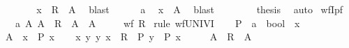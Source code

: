 \begin{isabellebody}
\ \ \ \ \isamarkupfalse%
\ \isamarkupfalse%
\ {\isachardoublequoteopen}x\ {\isasymnotin}\ R\ {\isacharbackquote}{\kern0pt}{\isacharbackquote}{\kern0pt}\ A{\isachardoublequoteclose}\ \isamarkupfalse%
\ blast\isanewline
\ \ \ \ \isamarkupfalse%
\ a\ \isamarkupfalse%
\ {\isachardoublequoteopen}x\ {\isasymnotin}\ A{\isachardoublequoteclose}\ \isamarkupfalse%
\ blast\isanewline
\ \ \isamarkupfalse%
\isanewline
\ \ \isamarkupfalse%
\ \isamarkupfalse%
\ {\isacharquery}{\kern0pt}thesis\ \isamarkupfalse%
\ auto\isanewline
{}\isamarkupfalse%
%
\endisatagproof
{\isafoldproof}%
%
\isadelimproof
\isanewline
%
\endisadelimproof
\isanewline
{}\isamarkupfalse%
\ wfI{\isacharunderscore}{\kern0pt}pf{\isacharcolon}{\kern0pt}\isanewline
\ \ \ a{\isacharcolon}{\kern0pt}\ {\isachardoublequoteopen}{\isasymAnd}A{\isachardot}{\kern0pt}\ A\ {\isasymsubseteq}\ R\ {\isacharbackquote}{\kern0pt}{\isacharbackquote}{\kern0pt}\ A\ {\isasymLongrightarrow}\ A\ {\isacharequal}{\kern0pt}\ {\isacharbraceleft}{\kern0pt}{\isacharbraceright}{\kern0pt}{\isachardoublequoteclose}\isanewline
\ \ \ {\isachardoublequoteopen}wf\ R{\isachardoublequoteclose}\isanewline
%
\isadelimproof
%
\endisadelimproof
%
\isatagproof
{}\isamarkupfalse%
\ {\isacharparenleft}{\kern0pt}rule\ wfUNIVI{\isacharparenright}{\kern0pt}\isanewline
\ \ \isamarkupfalse%
\ P\ {\isacharcolon}{\kern0pt}{\isacharcolon}{\kern0pt}\ {\isachardoublequoteopen}{\isacharprime}{\kern0pt}a\ {\isasymRightarrow}\ bool{\isachardoublequoteclose}\ \ x\isanewline
\ \ \isamarkupfalse%
\ {\isacharquery}{\kern0pt}A\ {\isacharequal}{\kern0pt}\ {\isachardoublequoteopen}{\isacharbraceleft}{\kern0pt}x{\isachardot}{\kern0pt}\ {\isasymnot}\ P\ x{\isacharbraceright}{\kern0pt}{\isachardoublequoteclose}\isanewline
\ \ \isamarkupfalse%
\ {\isachardoublequoteopen}{\isasymforall}x{\isachardot}{\kern0pt}\ {\isacharparenleft}{\kern0pt}{\isasymforall}y{\isachardot}{\kern0pt}\ {\isacharparenleft}{\kern0pt}y{\isacharcomma}{\kern0pt}\ x{\isacharparenright}{\kern0pt}\ {\isasymin}\ R\ {\isasymlongrightarrow}\ P\ y{\isacharparenright}{\kern0pt}\ {\isasymlongrightarrow}\ P\ x{\isachardoublequoteclose}\isanewline
\ \ \isamarkupfalse%
\ \isamarkupfalse%
\ {\isachardoublequoteopen}{\isacharquery}{\kern0pt}A\ {\isasymsubseteq}\ R\ {\isacharbackquote}{\kern0pt}{\isacharbackquote}{\kern0pt}\ {\isacharquery}{\kern0pt}A{\isachardoublequoteclose}\ \isamarkupfalse%

\end{isabellebody}
